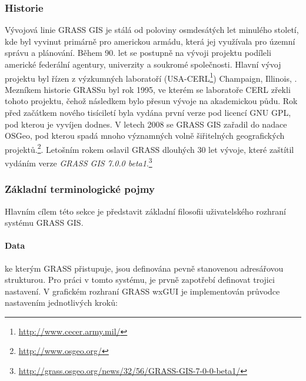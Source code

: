\documentclass[a4paper,12pt,oneside]{report}
\begin{document}
\subsubsection*{Historie}
Vývojová linie GRASS GIS je stálá od poloviny osmdesátých let minulého
století, kde byl vyvinut primárně pro americkou armádu, která jej
využívala pro územní správu a plánování. Během 90. let se postupně na
vývoji projektu podíleli americké federální agentury, univerzity a
soukromé společnosti. Hlavní vývoj projektu byl řízen z výzkumných
laboratoří (USA-CERL\footnote{\url{http://www.cecer.army.mil/}})
Champaign, Illinois, \cite{grasshist}.  Mezníkem historie GRASSu byl
rok 1995, ve kterém se laboratoře CERL zřekli tohoto projektu, čehož
následkem bylo přesun vývoje na akademickou půdu. Rok před začátkem
nového tisíciletí byla vydána první verze pod licencí GNU GPL, pod
kterou je vyvíjen dodnes. V letech 2008 se GRASS GIS zařadil do nadace
   \acs{OSGeo}, pod kterou spadá mnoho významných volně šiřitelných
geografických
projektů.\footnote{\url{http://www.osgeo.org/}}. Letošním rokem
oslavil GRASS dlouhých 30 let vývoje, které zaštítil vydáním verze
\textit{GRASS GIS 7.0.0
  beta1}.\footnote{\url{http://grass.osgeo.org/news/32/56/GRASS-GIS-7-0-0-beta1/}}

\subsubsection*{Základní terminologické pojmy}
\label{subsubsec:grassterminologie}
Hlavním cílem této sekce je představit základní filosofii
uživatelského rozhraní systému GRASS GIS.
\paragraph*{Data} ke kterým GRASS přistupuje, jsou definována pevně
stanovenou adresářovou strukturou. Pro práci v tomto systému, je prvně
zapotřebí definovat trojici nastavení. V grafickém rozhraní GRASS
   \acs{wxGUI} je implementován průvodce nastavením jednotlivých kroků:
\end{document}
